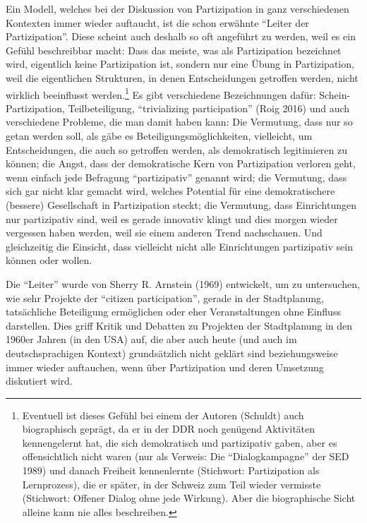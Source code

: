 \documentclass[a4paper,
fontsize=11pt,
oneside,
numbers=noperiodatend,
parskip=half-,
bibliography=totoc,
final
]{scrartcl}
\begin{document}
Ein Modell, welches bei der Diskussion von Partizipation in ganz
verschiedenen Kontexten immer wieder auftaucht, ist die schon erwähnte
\enquote{Leiter der Partizipation}. Diese scheint auch deshalb so oft
angeführt zu werden, weil es ein Gefühl beschreibbar macht: Dass das
meiste, was als Partizipation bezeichnet wird, eigentlich keine
Partizipation ist, sondern nur eine Übung in Partizipation, weil die
eigentlichen Strukturen, in denen Entscheidungen getroffen werden, nicht
wirklich beeinflusst werden.\footnote{Eventuell ist dieses Gefühl bei
  einem der Autoren (Schuldt) auch biographisch geprägt, da er in der
  DDR noch genügend Aktivitäten kennengelernt hat, die sich demokratisch
  und partizipativ gaben, aber es offensichtlich nicht waren (nur als
  Verweis: Die \enquote{Dialogkampagne} der SED 1989) und danach
  Freiheit kennenlernte (Stichwort: Partizipation als Lernprozess), die
  er später, in der Schweiz zum Teil wieder vermisste (Stichwort:
  Offener Dialog ohne jede Wirkung). Aber die biographische Sicht
  alleine kann nie alles beschreiben.} Es gibt verschiedene
Bezeichnungen dafür: Schein-Partizipation, Teilbeteiligung,
\enquote{trivializing participation} (Roig 2016) und auch verschiedene
Probleme, die man damit haben kann: Die Vermutung, dass nur so getan
werden soll, als gäbe es Beteiligungsmöglichkeiten, vielleicht, um
Entscheidungen, die auch so getroffen werden, als demokratisch
legitimieren zu können; die Angst, dass der demokratische Kern von
Partizipation verloren geht, wenn einfach jede Befragung
\enquote{partizipativ} genannt wird; die Vermutung, dass sich gar nicht
klar gemacht wird, welches Potential für eine demokratischere (bessere)
Gesellschaft in Partizipation steckt; die Vermutung, dass Einrichtungen
nur partizipativ sind, weil es gerade innovativ klingt und dies morgen
wieder vergessen haben werden, weil sie einem anderen Trend nachschauen.
Und gleichzeitig die Einsicht, dass vielleicht nicht alle Einrichtungen
partizipativ sein können oder wollen.

Die \enquote{Leiter} wurde von Sherry R. Arnstein (1969) entwickelt, um
zu untersuchen, wie sehr Projekte der \enquote{citizen participation},
gerade in der Stadtplanung, tatsächliche Beteiligung ermöglichen oder
eher Veranstaltungen ohne Einfluss darstellen. Dies griff Kritik und
Debatten zu Projekten der Stadtplanung in den 1960er Jahren (in den USA)
auf, die aber auch heute (und auch im deutschsprachigen Kontext)
grundsätzlich nicht geklärt sind beziehungsweise immer wieder
auftauchen, wenn über Partizipation und deren Umsetzung diskutiert wird.
\end{document}
